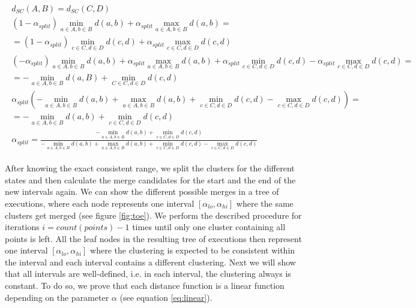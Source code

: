 \begin{equation}
    \begin{aligned}
        \begin{gathered}
        d_{SC}(A,B) = d_{SC}(C,D)\\
        (1 - \alpha_{split}) \min\limits_{a \in A, b \in B} d(a,b) + \alpha_{split} \max\limits_{a \in A, b \in B} d(a,b) = \\
        = (1 - \alpha_{split}) \min\limits_{c \in C, d \in D} d(c,d) + \alpha_{split} \max\limits_{c \in C, d \in D} d(c,d)\\
        (- \alpha_{split}) \min\limits_{a \in A, b \in B} d(a,b) + \alpha_{split} \max\limits_{a \in A, b \in B} d(a,b) + \alpha_{split} \min\limits_{c \in C, d \in D} d(c,d) - \alpha_{split} \max\limits_{c \in C, d \in D} d(c,d) =\\
        = - \min\limits_{a \in A, b \in B} d(a,B) + \min\limits_{C \in C, d \in D} d(c,d)\\
        \alpha_{split} (- \min\limits_{a \in A, b \in B} d(a,b) + \max\limits_{a \in A, b \in B} d(a,b) + \min\limits_{c \in C, d \in D} d(c,d) - \max\limits_{c \in C, d \in D} d(c,d)) =\\
        = - \min\limits_{a \in A, b \in B} d(a,b) + \min\limits_{c \in C, d \in D} d(c,d)\\
        \alpha_{split} = \frac{- \min\limits_{a \in A, b \in B} d(a,b) + \min\limits_{c \in C, d \in D} d(c,d)}{- \min\limits_{a \in A, b \in B} d(a,b) + \max\limits_{a \in A, b \in B} d(a,b) + \min\limits_{c \in C, d \in D} d(c,d) - \max\limits_{c \in C, d \in D} d(c,d)}
    \end{gathered}
    \end{aligned}
    \label{eq:equalizesc}
\end{equation}

After knowing the exact consistent range, we split the clusters for the different states and then calculate the merge candidates for the start and the end of the new intervals again. We can show the different possible merges in a tree of executions, where each node represents one interval $[\alpha_{lo}, \alpha_{hi}]$ where the same clusters get merged (see figure \ref{fig:toe}). We perform the described procedure for iterations $i = count(points) -1$ times until only one cluster containing all points is left. All the leaf nodes in the resulting tree of executions then represent one interval $[\alpha_{lo}, \alpha_{hi}]$ where the clustering is expected to be consistent within the interval and each interval contains a different clustering. Next we will show that all intervals are well-defined, i.e. in each interval, the clustering always is constant. To do so, we prove that each distance function is a linear function depending on the parameter $\alpha$ (see equation \ref{eq:linear}).


